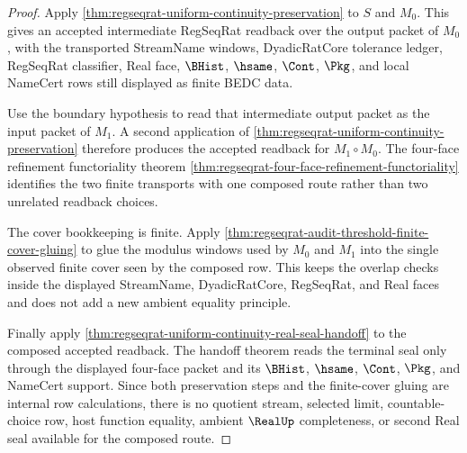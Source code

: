 \begin{proof}
Apply \autoref{thm:regseqrat-uniform-continuity-preservation} to $S$ and
$M_0$. This gives an accepted intermediate RegSeqRat readback over the output
packet of $M_0$, with the transported StreamName windows, DyadicRatCore
tolerance ledger, RegSeqRat classifier, Real face, $\BHist$, $\hsame$, $\Cont$,
$\Pkg$, and local NameCert rows still displayed as finite BEDC data.

Use the boundary hypothesis to read that intermediate output packet as the
input packet of $M_1$. A second application of
\autoref{thm:regseqrat-uniform-continuity-preservation} therefore produces the
accepted readback for $M_1 \circ M_0$. The four-face refinement functoriality
theorem \autoref{thm:regseqrat-four-face-refinement-functoriality} identifies
the two finite transports with one composed route rather than two unrelated
readback choices.

The cover bookkeeping is finite. Apply
\autoref{thm:regseqrat-audit-threshold-finite-cover-gluing} to glue the
modulus windows used by $M_0$ and $M_1$ into the single observed finite cover
seen by the composed row. This keeps the overlap checks inside the displayed
StreamName, DyadicRatCore, RegSeqRat, and Real faces and does not add a new
ambient equality principle.

Finally apply \autoref{thm:regseqrat-uniform-continuity-real-seal-handoff} to
the composed accepted readback. The handoff theorem reads the terminal seal
only through the displayed four-face packet and its $\BHist$, $\hsame$,
$\Cont$, $\Pkg$, and NameCert support. Since both preservation steps and the
finite-cover gluing are internal row calculations, there is no quotient stream,
selected limit, countable-choice row, host function equality, ambient
$\RealUp$ completeness, or second Real seal available for the composed route.
\end{proof}

